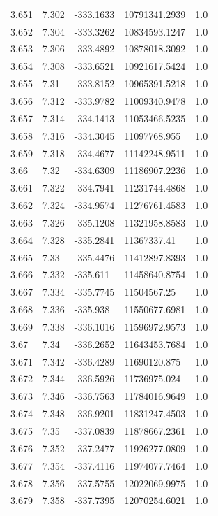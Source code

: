 \begin{tabular}{lllll}
3.651 & 7.302 & -333.1633 & 10791341.2939 & 1.0 \\
3.652 & 7.304 & -333.3262 & 10834593.1247 & 1.0 \\
3.653 & 7.306 & -333.4892 & 10878018.3092 & 1.0 \\
3.654 & 7.308 & -333.6521 & 10921617.5424 & 1.0 \\
3.655 & 7.31 & -333.8152 & 10965391.5218 & 1.0 \\
3.656 & 7.312 & -333.9782 & 11009340.9478 & 1.0 \\
3.657 & 7.314 & -334.1413 & 11053466.5235 & 1.0 \\
3.658 & 7.316 & -334.3045 & 11097768.955 & 1.0 \\
3.659 & 7.318 & -334.4677 & 11142248.9511 & 1.0 \\
3.66 & 7.32 & -334.6309 & 11186907.2236 & 1.0 \\
3.661 & 7.322 & -334.7941 & 11231744.4868 & 1.0 \\
3.662 & 7.324 & -334.9574 & 11276761.4583 & 1.0 \\
3.663 & 7.326 & -335.1208 & 11321958.8583 & 1.0 \\
3.664 & 7.328 & -335.2841 & 11367337.41 & 1.0 \\
3.665 & 7.33 & -335.4476 & 11412897.8393 & 1.0 \\
3.666 & 7.332 & -335.611 & 11458640.8754 & 1.0 \\
3.667 & 7.334 & -335.7745 & 11504567.25 & 1.0 \\
3.668 & 7.336 & -335.938 & 11550677.6981 & 1.0 \\
3.669 & 7.338 & -336.1016 & 11596972.9573 & 1.0 \\
3.67 & 7.34 & -336.2652 & 11643453.7684 & 1.0 \\
3.671 & 7.342 & -336.4289 & 11690120.875 & 1.0 \\
3.672 & 7.344 & -336.5926 & 11736975.024 & 1.0 \\
3.673 & 7.346 & -336.7563 & 11784016.9649 & 1.0 \\
3.674 & 7.348 & -336.9201 & 11831247.4503 & 1.0 \\
3.675 & 7.35 & -337.0839 & 11878667.2361 & 1.0 \\
3.676 & 7.352 & -337.2477 & 11926277.0809 & 1.0 \\
3.677 & 7.354 & -337.4116 & 11974077.7464 & 1.0 \\
3.678 & 7.356 & -337.5755 & 12022069.9975 & 1.0 \\
3.679 & 7.358 & -337.7395 & 12070254.6021 & 1.0 \\

\end{tabular}
